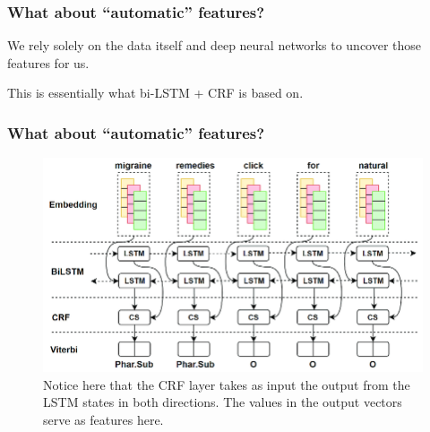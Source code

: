 \documentclass{beamer}
\begin{document}
\begin{frame}
    \frametitle{What about ``automatic'' features?}
    We rely solely on the data itself and deep neural networks to uncover those features for us. 
    
    \vspace{10pt}
    
    This is essentially what bi-LSTM + CRF is based on.
\end{frame}

\begin{frame}
    \frametitle{What about ``automatic'' features?}
    \begin{figure}
        \includegraphics[scale=0.25]{bilstm-crf}
        \caption{Notice here that the CRF layer takes as input the output from the LSTM states in both directions. The values in the output vectors serve as features here.}
    \end{figure}

\end{frame}

%
%
\end{document}
